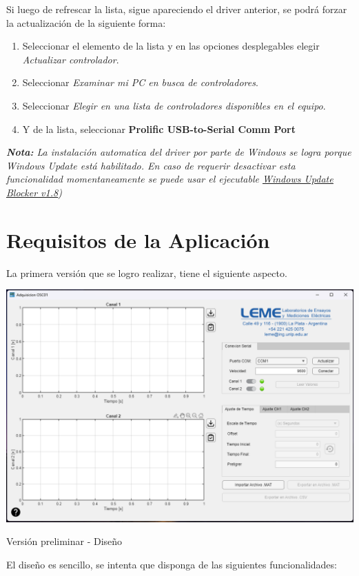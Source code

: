 Si luego de refrescar la lista, sigue apareciendo el driver anterior, se podrá forzar la actualización de la siguiente forma:

\vfill
\newpage

\begin{enumerate}
	\item Seleccionar el elemento de la lista y en las opciones desplegables elegir \textit{Actualizar controlador}.
	\item Seleccionar \textit{Examinar mi PC en busca de controladores}.
	\item Seleccionar \textit{Elegir en una lista de controladores disponibles en el equipo}.
	\item Y de la lista, seleccionar \textbf{Prolific USB-to-Serial Comm Port}
\end{enumerate}

\vspace{5mm}

\textit{\textbf{Nota:} La instalación automatica del driver por parte de Windows se logra porque Windows Update está habilitado. En caso de requerir desactivar esta funcionalidad momentaneamente se puede usar el ejecutable \href{https://www.sordum.org/9470/windows-update-blocker-v1-8/}{\underline{Windows Update Blocker v1.8}})}



\section{Requisitos de la Aplicación}
La primera versión que se logro realizar, tiene el siguiente aspecto.
\begin{center}
	\includegraphics[width=0.8\columnwidth]{images/version_preliminar.png}
	\captionsetup{type=figure}
	\caption{Versión preliminar - Diseño}
	\label{fig:app-pantalla-principal}
\end{center}
El diseño es sencillo, se intenta que disponga de las siguientes funcionalidades:

